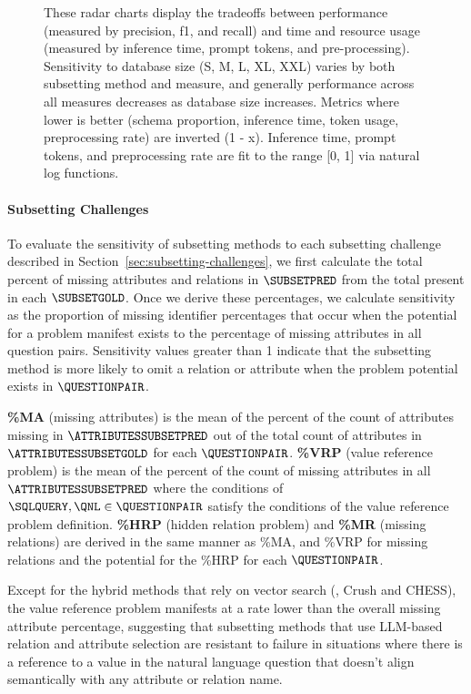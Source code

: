 \begin{figure}
\begin{subfigure}{0.27\linewidth}
  \end{subfigure}
  \caption{These radar charts display the tradeoffs between performance (measured by precision, f1, and recall) and time and resource usage (measured by inference time, prompt tokens, and pre-processing). Sensitivity to database size (S, M, L, XL, XXL) varies by both subsetting method and measure, and generally performance across all measures decreases as database size increases. Metrics where lower is better (schema proportion, inference time, token usage, preprocessing rate) are inverted (1 - x). Inference time, prompt tokens, and preprocessing rate are fit to the range [0, 1] via natural log functions.}
  \label{fig:method-radars-by-schema-size}
\end{figure}



\paragraph{\textbf{Subsetting Challenges}}

To evaluate the sensitivity of subsetting methods to each subsetting challenge described in Section~\ref{sec:subsetting-challenges}, we first calculate the total percent of missing attributes and relations in $\SUBSETPRED$ from the total present in each $\SUBSETGOLD$.
Once we derive these percentages, we calculate sensitivity as the proportion of missing identifier percentages that occur when the potential for a problem manifest exists to the percentage of missing attributes in all question pairs.
Sensitivity values greater than 1 indicate that the subsetting method is more likely to omit a relation or attribute when the problem potential exists in $\QUESTIONPAIR$.

\textbf{\%MA} (missing attributes) is the mean of the percent of the count of attributes missing in $\ATTRIBUTESSUBSETPRED$ out of the total count of attributes in $\ATTRIBUTESSUBSETGOLD$ for each $\QUESTIONPAIR$. 
\textbf{\%VRP} (value reference problem) is the mean of the percent of the count of missing attributes in all $\ATTRIBUTESSUBSETPRED$ where the conditions of $\SQLQUERY, \QNL \in \QUESTIONPAIR$ satisfy the conditions of the value reference problem definition.  
\textbf{\%HRP} (hidden relation problem) and \textbf{\%MR} (missing relations) are derived in the same manner as \%MA, and \%VRP for missing relations and the potential for the \%HRP for each $\QUESTIONPAIR$.

Except for the hybrid methods that rely on vector search (\PROJECTNAME, Crush and CHESS), the value reference problem manifests at a rate lower than the overall missing attribute percentage, suggesting that subsetting methods that use LLM-based relation and attribute selection are resistant to failure in situations where there is a reference to a value in the natural language question that doesn't align semantically with any attribute or relation name.

